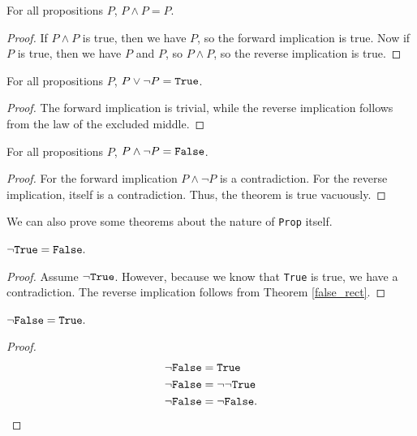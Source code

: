 \documentclass[../../math.tex]{subfiles}
\begin{document}
\begin{theorem} \label{and_idemp}
    For all propositions $P$, $P \wedge P = P$.
\end{theorem}
\begin{proof}
    If $P \wedge P$ is true, then we have $P$, so the forward implication is
    true.  Now if $P$ is true, then we have $P$ and $P$, so $P \wedge P$, so the
    reverse implication is true.
\end{proof}

\begin{theorem} \label{or_both}
    For all propositions $P$, $P \vee \neg P = \vtt{True}$.
\end{theorem}
\begin{proof}
    The forward implication is trivial, while the reverse implication follows
    from the law of the excluded middle.
\end{proof}

\begin{theorem} \label{and_both}
    For all propositions $P$, $P \wedge \neg P = \vtt{False}$.
\end{theorem}
\begin{proof}
    For the forward implication $P \wedge \neg P$ is a contradiction.  For the
    reverse implication,  itself is a contradiction.  Thus, the
    theorem is true vacuously.
\end{proof}

We can also prove some theorems about the nature of \verb|Prop| itself.

\begin{theorem} \label{not_true}
    $\neg \verb|True| = \verb|False|.$
\end{theorem}
\begin{proof}
    Assume $\neg \verb|True|$.  However, because we know that \verb|True| is
    true, we have a contradiction.  The reverse implication follows from Theorem
    \ref{false_rect}.
\end{proof}

\begin{theorem} \label{not_false}
    $\neg \verb|False| = \verb|True|.$
\end{theorem}
\begin{proof}
    \begin{align*}
        \neg \vtt{False} &= \vtt{True} \\
        \neg \vtt{False} &= \neg \neg \vtt{True} \\
        \neg \vtt{False} &= \neg \vtt{False}.
    \end{align*}
\end{proof}
\end{document}
